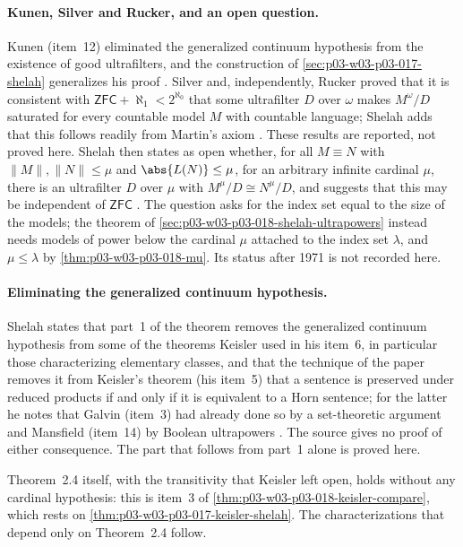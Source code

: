 \paragraph{Kunen, Silver and Rucker, and an open question.}  Kunen (item~12)
eliminated the generalized continuum hypothesis from the existence of good
ultrafilters, and the construction of
\cref{sec:p03-w03-p03-017-shelah} generalizes his proof
\cite[p.~225]{Shelah1971Ultrapowers}.  Silver and, independently, Rucker
proved that it is consistent with \(\mathsf{ZFC}+\aleph_1<2^{\aleph_0}\)
that some ultrafilter \(D\) over \(\omega\) makes \(M^\omega/D\) saturated
for every countable model \(M\) with countable language; Shelah adds that
this follows readily from Martin's axiom
\cite[p.~225]{Shelah1971Ultrapowers}.  These results are reported, not
proved here.  Shelah then states as open whether, for all \(M\equiv N\) with
\(\lVert M\rVert,\lVert N\rVert\le\mu\) and \(\abs{L(N)}\le\mu\), for an
arbitrary infinite cardinal \(\mu\), there is an ultrafilter \(D\) over
\(\mu\) with \(M^\mu/D\cong N^\mu/D\), and suggests that this may be
independent of \(\mathsf{ZFC}\) \cite[p.~225]{Shelah1971Ultrapowers}.  The
question asks for the index set equal to the size of the models; the theorem
of \cref{sec:p03-w03-p03-018-shelah-ultrapowers} instead needs models of
power below the cardinal \(\mu\) attached to the index set \(\lambda\), and
\(\mu\le\lambda\) by \cref{thm:p03-w03-p03-018-mu}.  Its status after 1971
is not recorded here.

\paragraph{Eliminating the generalized continuum hypothesis.}  Shelah states
that part~1 of the theorem removes the generalized continuum hypothesis from
some of the theorems Keisler used in his item~6, in particular those
characterizing elementary classes, and that the technique of the paper
removes it from Keisler's theorem (his item~5) that a sentence is preserved
under reduced products if and only if it is equivalent to a Horn sentence;
for the latter he notes that Galvin (item~3) had already done so by a
set-theoretic argument and Mansfield (item~14) by Boolean ultrapowers
\cite[p.~225]{Shelah1971Ultrapowers}.  The source gives no proof of either
consequence.  The part that follows from part~1 alone is proved here.

Theorem~2.4 itself, with the transitivity that Keisler left open, holds
without any cardinal hypothesis: this is item~3 of
\cref{thm:p03-w03-p03-018-keisler-compare}, which rests on
\cref{thm:p03-w03-p03-017-keisler-shelah}.  The characterizations that
depend only on Theorem~2.4 follow.

